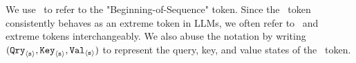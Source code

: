 We use \bos~to refer to the "Beginning-of-Sequence" token. Since the \bos~token consistently behaves as an extreme token in LLMs, we often refer to \bos~and extreme tokens interchangeably. We also abuse the notation by writing $({\tt Qry}_{\texttt{$\langle \texttt{s}\rangle$}}, {\tt Key}_{\texttt{$\langle \texttt{s}\rangle$}}, {\tt Val}_{\texttt{$\langle \texttt{s}\rangle$}})$ to represent the query, key, and value states of the \bos~token.



